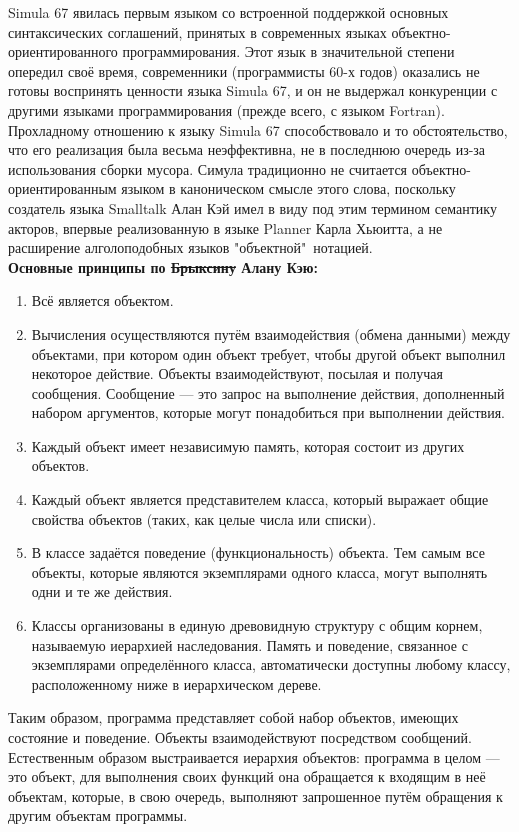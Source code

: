 \documentclass[12pt, a4paper]{article}
\begin{document}
Simula 67 явилась первым языком со встроенной поддержкой основных синтаксических соглашений, принятых в современных языках объектно-ориентированного программирования. Этот язык в значительной степени опередил своё время, современники (программисты 60-х годов) оказались не готовы воспринять ценности языка Simula 67, и он не выдержал конкуренции с другими языками программирования (прежде всего, с языком Fortran). Прохладному отношению к языку Simula 67 способствовало и то обстоятельство, что его реализация была весьма неэффективна, не в последнюю очередь из-за использования сборки мусора. Симула традиционно не считается объектно-ориентированным языком в каноническом смысле этого слова, поскольку создатель языка Smalltalk Алан Кэй имел в виду под этим термином семантику акторов, впервые реализованную в языке Planner Карла Хьюитта, а не расширение алголоподобных языков "объектной"\ нотацией.\\

\textbf{Основные принципы по \sout{Брыксину} Алану Кэю:}
\begin{enumerate}
    \item Всё является объектом.
    \item Вычисления осуществляются путём взаимодействия (обмена данными) между объектами, при котором один объект требует, чтобы другой объект выполнил некоторое действие. Объекты взаимодействуют, посылая и получая сообщения. Сообщение — это запрос на выполнение действия, дополненный набором аргументов, которые могут понадобиться при выполнении действия.
    \item Каждый объект имеет независимую память, которая состоит из других объектов.
    \item Каждый объект является представителем класса, который выражает общие свойства объектов (таких, как целые числа или списки).
    \item В классе задаётся поведение (функциональность) объекта. Тем самым все объекты, которые являются экземплярами одного класса, могут выполнять одни и те же действия.
    \item Классы организованы в единую древовидную структуру с общим корнем, называемую иерархией наследования. Память и поведение, связанное с экземплярами определённого класса, автоматически доступны любому классу, расположенному ниже в иерархическом дереве.
\end{enumerate}

Таким образом, программа представляет собой набор объектов, имеющих состояние и поведение. Объекты взаимодействуют посредством сообщений. Естественным образом выстраивается иерархия объектов: программа в целом — это объект, для выполнения своих функций она обращается к входящим в неё объектам, которые, в свою очередь, выполняют запрошенное путём обращения к другим объектам программы.\\
\end{document}
